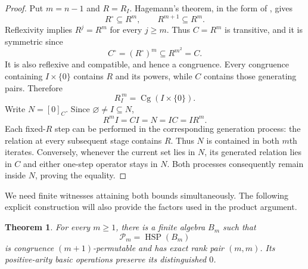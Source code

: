 \documentclass[12pt,english]{amsart}
\newtheorem{theorem}{Theorem}[section]
\theoremstyle{definition}
\numberwithin{equation}{section}
\theoremstyle{remark}
\begin{document}
\begin{proof}
Put $m=n-1$ and $R=R_I$. Hagemann's theorem, in the form of
\cite[Theorem~1.1]{JRV14}, gives
\[
R^\circ\subseteq R^m,\qquad R^{m+1}\subseteq R^m.
\]
Reflexivity implies $R^j=R^m$ for every $j\geqslant m$. Thus $C=R^m$
is transitive, and it is symmetric since
\[
C^\circ=(R^\circ)^m\subseteq R^{m^2}=C.
\]
It is also reflexive and compatible, and hence a congruence.
Every congruence containing $I\times\{0\}$ contains $R$ and its
powers, while $C$ contains those generating pairs. Therefore
\begin{equation}\label{EqHagemannStarPower}
R_I^{\,m}=\operatorname{Cg}(I\times\{0\}).
\end{equation}
Write $N=[0]_C$. Since $\varnothing\ne I\subseteq N$,
\[
R^mI=CI=N=IC=IR^m.
\]
Each fixed-$R$ step can be performed in the corresponding generation
process: the relation at every subsequent stage contains $R$.
Thus $N$ is contained in both $m$th iterates. Conversely, whenever
the current set lies in $N$, its generated relation lies in $C$ and
either one-step operator stays in $N$. Both processes consequently
remain inside $N$, proving the equality.
\end{proof}

We need finite witnesses attaining both bounds simultaneously. The
following explicit construction will also provide the factors used
in the product argument.

\begin{theorem}\label{ThmHMSharpRanks}
For every $m\geqslant1$, there is a finite algebra
$B_m$ such that
\[
\mathcal P_m=\operatorname{HSP}(B_m)
\]
is congruence $(m+1)$-permutable and has exact rank pair $(m,m)$.
Its positive-arity basic operations preserve its distinguished $0$.
\end{theorem}
\end{document}
